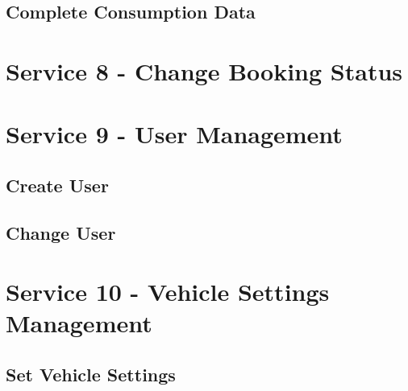 \subsection*{Complete Consumption Data}
\label{subsec:Nachrichten:Dienst5:CompleteConsumption}






\section{Service 8 - Change Booking Status}
\label{sec:Nachrichten:Dienst8}





\section{Service 9 - User Management}
\label{sec:Nachrichten:Dienst9}

\subsection*{Create User}
\label{subsec:Nachrichten:Dienst9:CreateUser}





\subsection*{Change User}
\label{subsec:Nachrichten:Dienst9:ChangeUser}






\section{Service 10 - Vehicle Settings Management}
\label{sec:Nachrichten:Dienst10}

\subsection*{Set Vehicle Settings}
\label{subsec:Nachrichten:Dienst10:SetBookingSettings}





